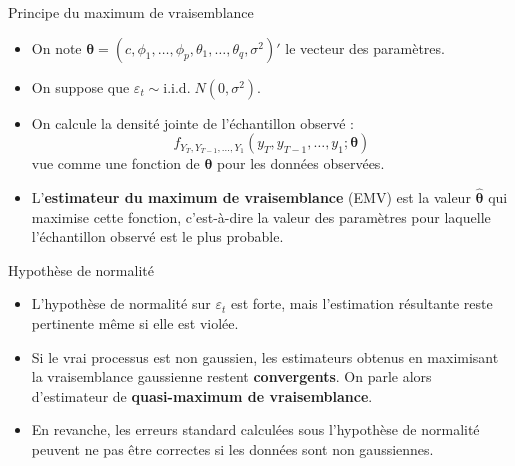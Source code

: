 \documentclass[11pt,aspectratio=169]{beamer}
\begin{document}
\begin{frame}{Principe du maximum de vraisemblance}

\begin{itemize}

\item On note $\bm{\theta} = (c, \phi_1, \ldots, \phi_p, \theta_1, \ldots, \theta_q, \sigma^2)'$ le vecteur des paramètres.\newline

\item On suppose que $\varepsilon_t \sim \text{i.i.d.} \; N(0, \sigma^2)$.\newline

\item On calcule la densité jointe de l'échantillon observé :
  \[
  f_{Y_T, Y_{T-1}, \ldots, Y_1}(y_T, y_{T-1}, \ldots, y_1; \bm{\theta})
  \]
  vue comme une fonction de $\bm{\theta}$ pour les données observées.\newline

\item L'\textbf{estimateur du maximum de vraisemblance} (EMV) est la valeur $\hat{\bm{\theta}}$ qui maximise cette fonction, c'est-à-dire la valeur des paramètres pour laquelle l'échantillon observé est le plus probable.

\end{itemize}

\end{frame}

\begin{frame}{Hypothèse de normalité}

\begin{itemize}

\item L'hypothèse de normalité sur $\varepsilon_t$ est forte, mais l'estimation résultante reste pertinente même si elle est violée.\newline

\item Si le vrai processus est non gaussien, les estimateurs obtenus en maximisant la vraisemblance gaussienne restent \textbf{convergents}. On parle alors d'estimateur de \textbf{quasi-maximum de vraisemblance}.\newline

\item En revanche, les erreurs standard calculées sous l'hypothèse de normalité peuvent ne pas être correctes si les données sont non gaussiennes.

\end{itemize}

\end{frame}
\end{document}
